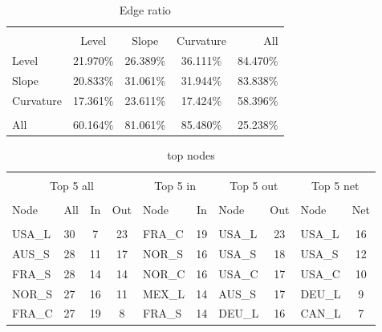 \documentclass{article}
\begin{document}

\begin{table}[h]
\caption{Edge ratio} %
\fontsize{10}{10}\selectfont
\centering%
\begin{tabular}{l | ccc  r}%
\hline\hline \\ [-1.5ex]                         %


	&	Level	&	Slope	&	Curvature	&	All	\\
Level	&	21.970\%	&	26.389\%	&	36.111\%	&	84.470\%	\\
Slope	&	20.833\%	&	31.061\%	&	31.944\%	&	83.838\%	\\
Curvature	&	17.361\%	&	23.611\%	&	17.424\%	&	58.396\%	\\
\hline \\ [-1.5ex]  
All	&	60.164\%	&	81.061\%	&	85.480\%	&	25.238\%	\\


\hline            
\end{tabular}
\label{table:nonlin}%
\end{table}


\begin{table}[h]
\caption{top nodes} %
\fontsize{10}{10}\selectfont
\setlength{\tabcolsep}{12pt}
\centering%
\begin{tabular}{l  lcc  lc lc  lc}%

\hline\hline \\ [-1.5ex]                         %


\multicolumn{4}{c}{Top 5 all}					&	\multicolumn{2}{c}{Top 5 in}			&	\multicolumn{2}{c}{Top 5 out}			&	\multicolumn{2}{c}{Top 5 net}	\\	
\hline \\ [-1.5ex]    
Node	&	All	&	In	&	Out	&	Node	&	In	&	Node	&	Out	&	Node	&	Net	\\
\hline \\ [-1.5ex]    
USA\_L&	30	&	7	&	23	&	FRA\_C	&	19	&	USA\_L	&	23	&	USA\_L	&	16	\\
AUS\_S	&	28	&	11	&	17	&	NOR\_S	&	16	&	USA\_S	&	18	&	USA\_S	&	12	\\
FRA\_S	&	28	&	14	&	14	&	NOR\_C	&	16	&	USA\_C	&	17	&	USA\_C	&	10	\\
NOR\_S	&	27	&	16	&	11	&	MEX\_L	&	14	&	AUS\_S	&	17	&	DEU\_L	&	9	\\
FRA\_C	&	27	&	19	&	8	&	FRA\_S	&	14	&	DEU\_L	&	16	&	CAN\_L	&	7	\\




\hline            
\end{tabular}
\label{table:nonlin}%
\end{table}
\end{document}
